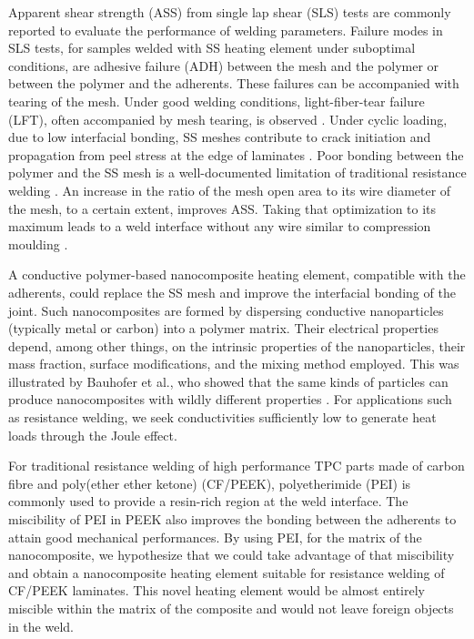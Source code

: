 \documentclass[11pt,review,times]{elsarticle}
\begin{document}
Apparent shear strength (ASS) from single lap shear (SLS) tests are commonly reported to evaluate the performance of welding parameters. 
Failure modes in SLS tests, for samples welded with SS heating element under suboptimal conditions, are adhesive failure (ADH) between the mesh and the polymer or between the polymer and the adherents. 
These failures can be accompanied with tearing of the mesh. 
Under good welding conditions, light-fiber-tear failure (LFT), often accompanied by mesh tearing, is observed \cite{Shi2014}. 
Under cyclic loading, due to low interfacial bonding, SS meshes contribute to crack initiation and propagation from peel stress at the edge of laminates \cite{Dube2008b,Dube2009a}. 
Poor bonding between the polymer and the SS mesh is a well-documented limitation of traditional resistance welding \cite{Dube2007,Dube2012a,Dube2009a,Shi2014,Shi2015a}. 
An increase in the ratio of the mesh open area to its wire diameter of the mesh, to a certain extent, improves ASS. 
Taking that optimization to its maximum leads to a weld interface without any wire similar to compression moulding \cite{Dube2012a}. 

A conductive polymer-based nanocomposite heating element, compatible with the adherents, could replace the SS mesh and improve the interfacial bonding of the joint. 
Such nanocomposites are formed by dispersing conductive nanoparticles (typically metal or carbon) into a polymer matrix. 
Their electrical properties depend, among other things, on the intrinsic properties of the nanoparticles, their mass fraction, surface modifications, and the mixing method employed. 
This was illustrated by Bauhofer et al., who showed that the same kinds of particles can produce nanocomposites with wildly different properties \cite{Bauhofer2009}. 
For applications such as resistance welding, we seek conductivities sufficiently low to generate heat loads through the Joule effect. 

For traditional resistance welding of high performance TPC parts made of carbon fibre and poly(ether ether ketone) (CF/PEEK), polyetherimide (PEI) is commonly used to provide a resin-rich region at the weld interface. 
The miscibility of PEI in PEEK \cite{Crevecoeur1991} also improves the bonding between the adherents to attain good mechanical performances. 
By using PEI, for the matrix of the nanocomposite, we hypothesize that we could take advantage of that miscibility and obtain a nanocomposite heating element suitable for resistance welding of CF/PEEK laminates. 
This novel heating element would be almost entirely miscible within the matrix of the composite and would not leave foreign objects in the weld. 
\end{document}
